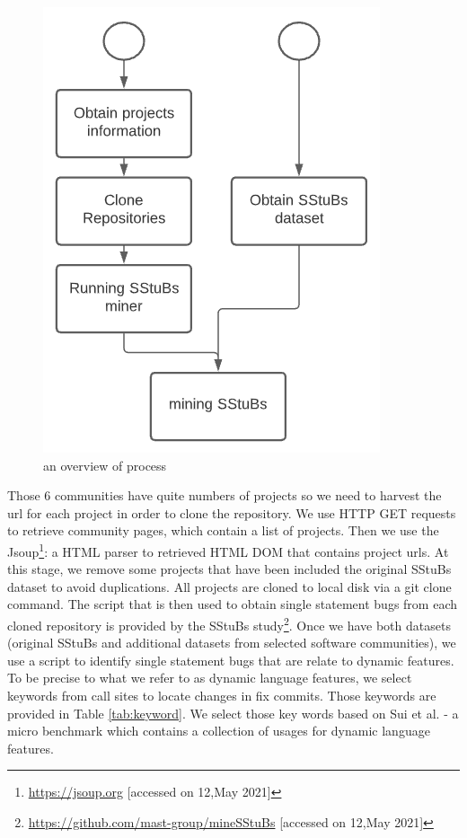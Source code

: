 \documentclass[sigconf,review,anonymous]{acmart}
\begin{document}
\begin{figure}[H]
  \centering
      \includegraphics[width=0.7\columnwidth]{figures/process.png}
  \caption{an overview of process}
  \label{fig:process}
\end{figure}


Those 6 communities have quite numbers of projects so we need to harvest the url for each project in order to clone the repository. We use HTTP GET requests to retrieve community pages, which contain a list of projects. Then we use the Jsoup\footnote{\url{https://jsoup.org} [accessed on 12,May 2021]}: a HTML parser to retrieved HTML DOM that contains project urls. At this stage, we remove some projects that have been included the original SStuBs dataset to avoid duplications. All projects are cloned to local disk via a git clone command.
The script that is then used to obtain single statement bugs from each cloned repository is provided by the SStuBs study\footnote{\url{https://github.com/mast-group/mineSStuBs} [accessed on 12,May 2021]}.  Once we have both datasets (original SStuBs and additional datasets from selected software communities), we use a script to identify single statement bugs that are relate to dynamic features. To be precise to what we refer to as dynamic language features, we select keywords from call sites to locate changes in fix commits. Those keywords are provided in Table \ref{tab:keyword}. We select those key words based on Sui et al. \cite{sui2018soundness} - a micro benchmark which contains a collection of usages for dynamic language features.
\end{document}
